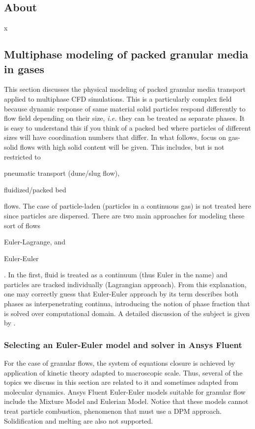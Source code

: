 \subsection{About \textcite{Ergun1952}}

x

\subsection{Multiphase modeling of packed granular media in gases}

This section discusses the physical modeling of packed granular media transport applied to multiphase CFD simulations. This is a particularly complex field because dynamic response of same material solid particles respond differently to flow field depending on their size, \emph{i.e.} they can be treated as separate phases. It is easy to understand this if you think of a packed bed where particles of different sizes will have coordination numbers that differ. In what follows, focus on gas-solid flows with high solid content will be given. This includes, but is not restricted to \begin{inparaenum}[(i)] \item pneumatic transport (dune/slug flow), \item fluidized/packed bed \end{inparaenum} flows. The case of particle-laden (particles in a continuous gas) is not treated here since particles are dispersed. There are two main approaches for modeling these sort of flows \begin{inparaenum}[(i)] \item Euler-Lagrange, and \item Euler-Euler\end{inparaenum}. In the first, fluid is treated as a continuum (thus Euler in the name) and particles are tracked individually (Lagrangian approach). From this explanation, one may correctly guess that Euler-Euler approach by its term describes both phases as interpenetrating continua, introducing the notion of phase fraction that is solved over computational domain. A detailed discussion of the subject is given by \textcite{Crowe2011}.

\subsubsection{Selecting an Euler-Euler model and solver in Ansys Fluent}

For the case of granular flows, the system of equations closure is achieved by application of kinetic theory adapted to macroscopic scale. Thus, several of the topics we discuss in this section are related to it and sometimes adapted from molecular dynamics. Ansys Fluent Euler-Euler models suitable for granular flow include the Mixture Model and Eulerian Model. Notice that these models cannot treat particle combustion, phenomenon that must use a DPM approach. Solidification and melting are also not supported.

